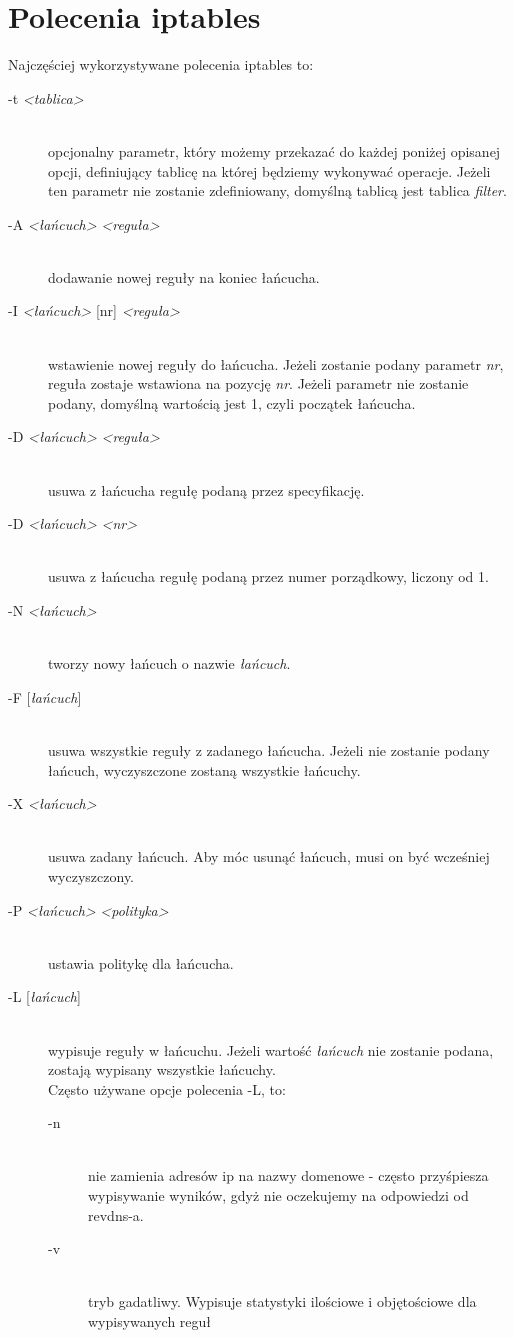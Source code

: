 \documentclass[a4paper,12pt,oneside]{book}
\newcommand{\param}[1]{\textit{\textless #1\textgreater}}
\begin{document}
	\section{Polecenia iptables}
		Najczęściej wykorzystywane polecenia iptables to:
		\begin{description}
			\item[-t \param{tablica}] \hfill \\
				opcjonalny parametr, który możemy przekazać do każdej poniżej opisanej opcji, definiujący tablicę na której będziemy wykonywać operacje.
				Jeżeli ten parametr nie zostanie zdefiniowany, domyślną tablicą jest tablica \textit{filter}.
			\item[-A \param{łańcuch} \param{reguła}] \hfil \\
				dodawanie nowej reguły na koniec łańcucha.
			\item[-I \param{łańcuch} {[nr]} \param{reguła}] \hfill \\
				wstawienie nowej reguły do łańcucha. Jeżeli zostanie podany parametr \textit{nr}, reguła zostaje wstawiona na pozycję \textit{nr}.
				Jeżeli parametr nie zostanie podany, domyślną wartością jest 1, czyli początek łańcucha.
			\item[-D \param{łańcuch} \param{reguła}] \hfill \\
				usuwa z łańcucha regułę podaną przez specyfikację.
			\item[-D \param{łańcuch} \param{nr}] \hfill \\
				usuwa z łańcucha regułę podaną przez numer porządkowy, liczony od 1.
			\item[-N \param{łańcuch}] \hfill \\
				tworzy nowy łańcuch o nazwie \textit{łańcuch}.
			\item[-F {[\textit{łańcuch}]}] \hfill \\
				usuwa wszystkie reguły z zadanego łańcucha. Jeżeli nie zostanie podany łańcuch, wyczyszczone zostaną wszystkie łańcuchy.
			\item[-X \param{łańcuch}] \hfill \\
				usuwa zadany łańcuch. Aby móc usunąć łańcuch, musi on być wcześniej wyczyszczony.	
			\item[-P \param{łańcuch} \param{polityka}] \hfill \\
				ustawia politykę dla łańcucha.
			\item[-L {[\textit{łańcuch}]}] \hfill \\
				wypisuje reguły w łańcuchu. Jeżeli wartość \textit{łańcuch} nie zostanie podana, zostają wypisany wszystkie łańcuchy.\\
				Często używane opcje polecenia -L, to:
				\begin{description}
					\item[-n] \hfill \\
						nie zamienia adresów ip na nazwy domenowe - często przyśpiesza wypisywanie wyników, gdyż nie oczekujemy na odpowiedzi od revdns-a.
					\item[-v] \hfill \\
						tryb gadatliwy. Wypisuje statystyki ilościowe i objętościowe dla wypisywanych reguł
				\end{description}
		\end{description}
\end{document}
